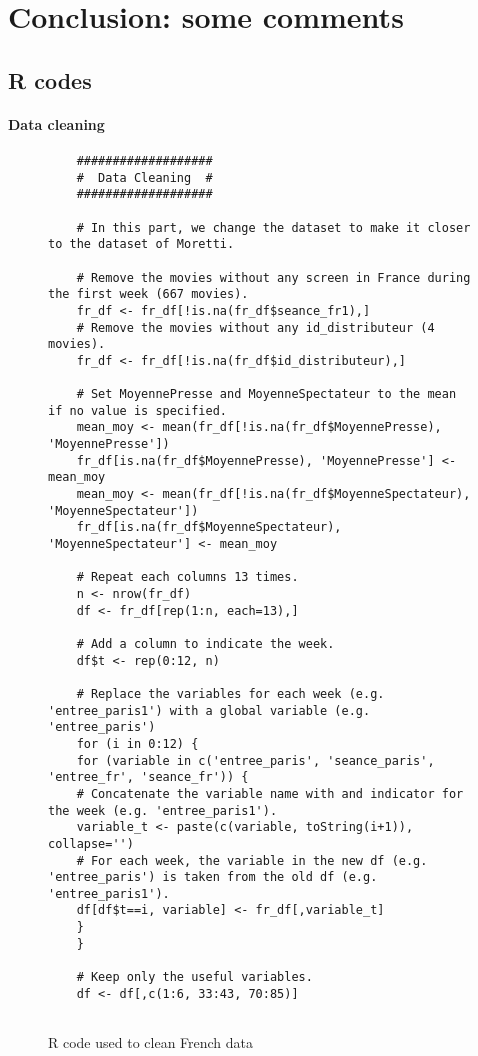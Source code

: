 \documentclass{article}
\begin{document}
\section{Conclusion: some comments}
\pagebreak
\begin{appendices}
\section{R codes}
\paragraph{Data cleaning}
\begin{figure}[H]
	\caption{R code used to clean French data}
	\label{code_data_cleaning}
	\begin{lstlisting}
	###################
	#  Data Cleaning  #
	###################
	
	# In this part, we change the dataset to make it closer to the dataset of Moretti.
	
	# Remove the movies without any screen in France during the first week (667 movies).
	fr_df <- fr_df[!is.na(fr_df$seance_fr1),]
	# Remove the movies without any id_distributeur (4 movies).
	fr_df <- fr_df[!is.na(fr_df$id_distributeur),]
	
	# Set MoyennePresse and MoyenneSpectateur to the mean if no value is specified.
	mean_moy <- mean(fr_df[!is.na(fr_df$MoyennePresse), 'MoyennePresse'])
	fr_df[is.na(fr_df$MoyennePresse), 'MoyennePresse'] <- mean_moy
	mean_moy <- mean(fr_df[!is.na(fr_df$MoyenneSpectateur), 'MoyenneSpectateur'])
	fr_df[is.na(fr_df$MoyenneSpectateur), 'MoyenneSpectateur'] <- mean_moy
	
	# Repeat each columns 13 times.
	n <- nrow(fr_df)
	df <- fr_df[rep(1:n, each=13),]
	
	# Add a column to indicate the week.
	df$t <- rep(0:12, n)
	
	# Replace the variables for each week (e.g. 'entree_paris1') with a global variable (e.g. 'entree_paris')
	for (i in 0:12) {
	for (variable in c('entree_paris', 'seance_paris', 'entree_fr', 'seance_fr')) {
	# Concatenate the variable name with and indicator for the week (e.g. 'entree_paris1').
	variable_t <- paste(c(variable, toString(i+1)), collapse='')
	# For each week, the variable in the new df (e.g. 'entree_paris') is taken from the old df (e.g. 'entree_paris1').
	df[df$t==i, variable] <- fr_df[,variable_t]
	}
	}
	
	# Keep only the useful variables.
	df <- df[,c(1:6, 33:43, 70:85)]
	

\end{lstlisting}
\end{figure}
\end{appendices}
\end{document}
